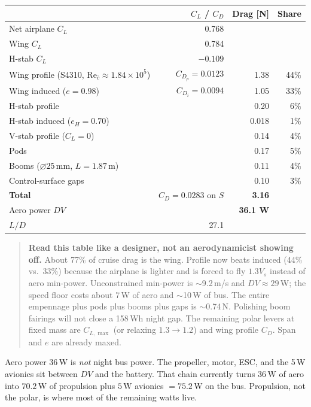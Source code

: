 \documentclass[11pt,letterpaper]{article}
\newenvironment{intuition}{\begin{quote}\small}{\end{quote}}
\begin{document}
\begin{center}
\begin{tabular}{@{}lrrr@{}}
\toprule
 & $C_L$ / $C_D$ & Drag [N] & Share \\
\midrule
Net airplane $C_L$ & 0.768 & & \\
Wing $C_L$ & 0.784 & & \\
H-stab $C_L$ & $-0.109$ & & \\
Wing profile (S4310, $\mathrm{Re}_{\bar{c}}\approx 1.84\times 10^5$) & $C_{D_p}=0.0123$ & 1.38 & 44\% \\
Wing induced ($e=0.98$) & $C_{D_i}=0.0094$ & 1.05 & 33\% \\
H-stab profile & & 0.20 & 6\% \\
H-stab induced ($e_H=0.70$) & & 0.018 & 1\% \\
V-stab profile ($C_L=0$) & & 0.14 & 4\% \\
Pods & & 0.17 & 5\% \\
Booms ($\varnothing 25\,\mathrm{mm}$, $L=1.87\,\mathrm{m}$) & & 0.11 & 4\% \\
Control-surface gaps & & 0.10 & 3\% \\
\midrule
\textbf{Total} & $C_D=0.0283$ on $S$ & \textbf{3.16} & \\
Aero power $DV$ & & \textbf{36.1 W} & \\
$L/D$ & 27.1 & & \\
\bottomrule
\end{tabular}
\end{center}

\begin{intuition}
\textbf{Read this table like a designer, not an aerodynamicist showing off.} About 77\% of cruise drag is the wing. Profile now beats induced (44\% vs.\ 33\%) because the airplane is lighter and is forced to fly $1.3 V_s$ instead of aero min-power. Unconstrained min-power is $\sim$9.2\,m/s and $DV \approx 29\,\mathrm{W}$; the speed floor costs about $7\,\mathrm{W}$ of aero and $\sim$10\,W of bus. The entire empennage plus pods plus booms plus gaps is $\sim$0.74\,N. Polishing boom fairings will not close a 158\,Wh night gap. The remaining polar levers at fixed mass are $C_{L,\max}$ (or relaxing $1.3\to 1.2$) and wing profile $C_D$. Span and $e$ are already maxed.
\end{intuition}

Aero power 36\,W is \emph{not} night bus power. The propeller, motor, ESC, and the 5\,W avionics sit between $DV$ and the battery. That chain currently turns 36\,W of aero into $70.2\,\mathrm{W}$ of propulsion plus $5\,\mathrm{W}$ avionics $= 75.2\,\mathrm{W}$ on the bus. Propulsion, not the polar, is where most of the remaining watts live.
\end{document}
